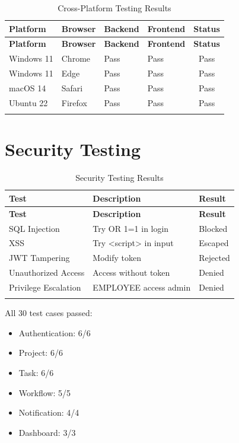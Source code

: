 \documentclass[12pt,a4paper,twoside]{book}
\begin{document}
\begin{longtable}{|l|l|l|l|c|}
\hline
\textbf{Platform} & \textbf{Browser} & \textbf{Backend} & \textbf{Frontend} & \textbf{Status} \\ \hline
\endfirsthead
\hline
\textbf{Platform} & \textbf{Browser} & \textbf{Backend} & \textbf{Frontend} & \textbf{Status} \\ \hline
\endhead
Windows 11 & Chrome & Pass & Pass & Pass \\ \hline
Windows 11 & Edge & Pass & Pass & Pass \\ \hline
macOS 14 & Safari & Pass & Pass & Pass \\ \hline
Ubuntu 22 & Firefox & Pass & Pass & Pass \\ \hline
\hline
\caption{Cross-Platform Testing Results}
\end{longtable}

\section{Security Testing}

\begin{longtable}{|l|p{4cm}|p{3cm}|}
\hline
\textbf{Test} & \textbf{Description} & \textbf{Result} \\ \hline
\endfirsthead
\hline
\textbf{Test} & \textbf{Description} & \textbf{Result} \\ \hline
\endhead
SQL Injection & Try OR 1=1 in login & Blocked \\ \hline
XSS & Try <script> in input & Escaped \\ \hline
JWT Tampering & Modify token & Rejected \\ \hline
Unauthorized Access & Access without token & Denied \\ \hline
Privilege Escalation & EMPLOYEE access admin & Denied \\ \hline
\hline
\caption{Security Testing Results}
\end{longtable}

All 30 test cases passed:
\begin{itemize}
    \item Authentication: 6/6
    \item Project: 6/6
    \item Task: 6/6
    \item Workflow: 5/5
    \item Notification: 4/4
    \item Dashboard: 3/3
\end{itemize}
\end{document}
